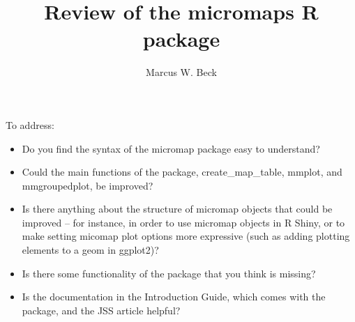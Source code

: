 \documentclass[letterpaper,12pt]{article}\usepackage[]{graphicx}\usepackage[]{color}
\begin{document}
\title{Review of the micromaps R package}
\author{Marcus W. Beck}
\maketitle

To address:
\begin{itemize}
\item Do you find the syntax of the micromap package easy to understand?
\item Could the main functions of the package, create\_map\_table, mmplot, and mmgroupedplot, be improved?
\item Is there anything about the structure of micromap objects that could be improved – for instance, in order to use micromap objects in R Shiny, or to make setting micomap plot options more expressive (such as adding plotting elements to a geom in ggplot2)?
\item Is there some functionality of the package that you think is missing?
\item Is the documentation in the Introduction Guide, which comes with the package, and the JSS article helpful?
\end{itemize}
\end{document}
